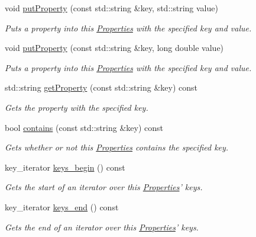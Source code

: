 \begin{DoxyCompactItemize}
void \hyperlink{classrepast_1_1_properties_a9008647e3045dbd18356d43c9f343fe0}{put\-Property} (const std\-::string \&key, std\-::string value)
\begin{DoxyCompactList}\small\item\em Puts a property into this \hyperlink{classrepast_1_1_properties}{Properties} with the specified key and value. \end{DoxyCompactList}\item 
void \hyperlink{classrepast_1_1_properties_ae11bdd22268c15934237acc3cdfa1e91}{put\-Property} (const std\-::string \&key, long double value)
\begin{DoxyCompactList}\small\item\em Puts a property into this \hyperlink{classrepast_1_1_properties}{Properties} with the specified key and value. \end{DoxyCompactList}\item 
std\-::string \hyperlink{classrepast_1_1_properties_a10845b8c51a4f23b9fe8e4bb3b2402e7}{get\-Property} (const std\-::string \&key) const 
\begin{DoxyCompactList}\small\item\em Gets the property with the specified key. \end{DoxyCompactList}\item 
bool \hyperlink{classrepast_1_1_properties_a00995681d4adf3abcd8910a6a1bb72ee}{contains} (const std\-::string \&key) const 
\begin{DoxyCompactList}\small\item\em Gets whether or not this \hyperlink{classrepast_1_1_properties}{Properties} contains the specified key. \end{DoxyCompactList}\item 
key\-\_\-iterator \hyperlink{classrepast_1_1_properties_aa3ec0c363bc6ccdc033aa6dc7cc29f70}{keys\-\_\-begin} () const 
\begin{DoxyCompactList}\small\item\em Gets the start of an iterator over this \hyperlink{classrepast_1_1_properties}{Properties}' keys. \end{DoxyCompactList}\item 
key\-\_\-iterator \hyperlink{classrepast_1_1_properties_a0b2a76982e541649e237ed8c59c86de6}{keys\-\_\-end} () const 
\begin{DoxyCompactList}\small\item\em Gets the end of an iterator over this \hyperlink{classrepast_1_1_properties}{Properties}' keys. \end{DoxyCompactList}\item 

\end{DoxyCompactItemize}
